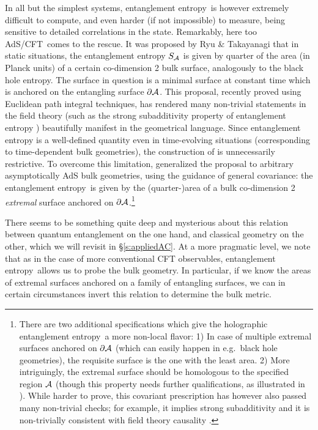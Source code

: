 \documentclass[12pt]{article}
\def\sect#1{\S\ref{#1}}
\def\AC{AdS/CFT}
\def\EE{entanglement entropy}
\begin{document}
In all but the simplest systems, \EE\ is however extremely difficult to compute, and even harder (if not impossible) to measure, being sensitive to detailed correlations in the state.  Remarkably, here too \AC\ comes to the rescue.  It was proposed by Ryu \& Takayanagi \cite{Ryu:2006bv}
that in static situations, the entanglement entropy $S_{\cal A}$ is given by quarter of the area (in Planck units) of a certain co-dimension 2 bulk surface, analogously to the black hole entropy.  The surface in question is a minimal surface at constant time which is anchored on the entangling surface $\partial {\cal A}$.  This proposal, recently proved \cite{Lewkowycz:2013nqa} using Euclidean path integral techniques, has 
rendered many non-trivial statements in the field theory (such as the strong subadditivity property of entanglement entropy \cite{Headrick:2007km}) beautifully manifest in the geometrical language.  
Since entanglement entropy is a well-defined quantity even in time-evolving situations (corresponding to time-dependent bulk geometries), the construction of \cite{Ryu:2006bv} is unnecessarily restrictive.  To overcome this limitation, \cite{Hubeny:2007xt} generalized the proposal to arbitrary asymptotically AdS bulk geometries, using the guidance of general covariance: the \EE\ is given by the (quarter-)area of a bulk co-dimension 2 {\it extremal} surface anchored on 
$\partial {\cal A}$.\footnote{
There are two additional specifications which give the holographic \EE\  a more non-local flavor:
1) In case of multiple extremal surfaces anchored on $\partial {\cal A}$ (which can easily happen in e.g.\ black hole geometries), the requisite surface is the one with the least area. 
2) More intriguingly, the extremal surface should be homologous to the specified region ${\cal A}$ (though this property needs further qualifications, as illustrated in \cite{Hubeny:2013gta}).
While harder to prove, this covariant prescription has however also passed many non-trivial checks; for example, it implies strong subadditivity \cite{Wall:2012uf} and it is non-trivially consistent with field theory causality \cite{Headrick:2014cta}. }

There seems to be something quite deep and mysterious about this relation between quantum entanglement on the one hand, and classical geometry on the other, which we will revisit in \sect{s:appliedAC}.  
At a more pragmatic level, we note that
as in the case of more conventional CFT observables, \EE\ allows us to probe the bulk geometry.  In particular, if we know the areas of extremal surfaces anchored on a family of entangling surfaces, we can in certain circumstances invert this relation to determine the bulk metric.
\end{document}
